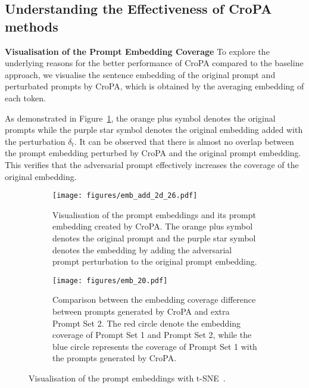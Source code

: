\vspace{-0.5cm}

\subsection{Understanding the Effectiveness of CroPA methods}
\textbf{Visualisation of the Prompt Embedding Coverage}  To explore the underlying reasons for the better performance of CroPA compared to the baseline approach, we visualise the sentence embedding of the original prompt and perturbated prompts by CroPA, which is obtained by the averaging embedding of each token. 

As demonstrated in Figure~\ref{fig:2d-emb}, the orange plus symbol denotes the original prompts while the purple star symbol denotes the original embedding added with the perturbation $\delta_t$.  It can be observed that there is almost no overlap between the prompt embedding perturbed by CroPA and the original prompt embedding. This verifies that the adversarial prompt effectively increases the coverage of the original embedding.

\begin{figure}[!t]
\centering
    \begin{subfigure}[b]{0.48\textwidth}
    \centering
    \texttt{[image: figures/emb\_add\_2d\_26.pdf]}\vspace{-0.3cm}
    \caption{\footnotesize{Visualisation of the prompt embeddings and its prompt embedding created by CroPA. The orange plus symbol denotes the original prompt and the purple star symbol denotes the embedding by adding the adversarial prompt perturbation to the original prompt embedding.} }
       \label{fig:2d-emb}\end{subfigure}\hspace{0.2cm}
    \begin{subfigure}[b]{0.48\textwidth}
    \centering
    \texttt{[image: figures/emb\_20.pdf]}\vspace{-0.3cm}
    \caption{\footnotesize{Comparison between the embedding coverage difference between prompts generated by CroPA and extra Prompt Set 2. The red circle denote the embedding coverage of Prompt Set 1 and Prompt Set 2, while the blue circle represents the coverage of Prompt Set 1 with the prompts generated by CroPA. } }
    \label{fig:comparison-CroPA}
    \end{subfigure}\vspace{-0.2cm}
    \caption{Visualisation of the prompt embeddings with t-SNE~\citep{van2008visualizing}.}
    \vspace{-0.3cm}
\end{figure}

